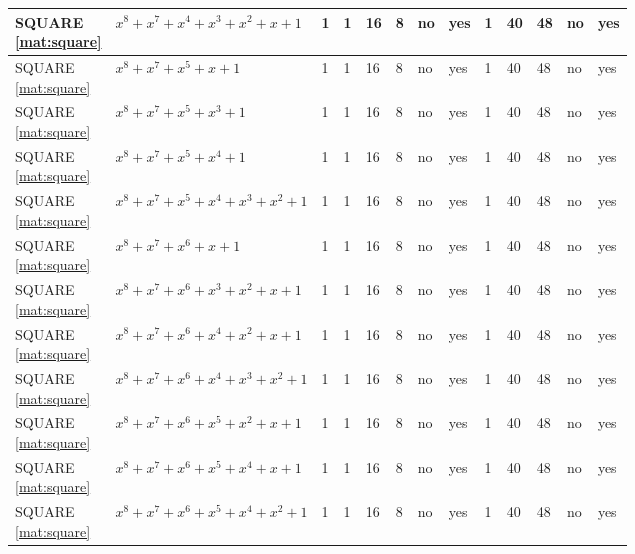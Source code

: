 \begin{tiny}
\begin{longtable}{|l|l|l|l|l|l|l|l|l|l|l|l|l|}
\shortstack{SQUARE \\ \eqref{mat:square}} & $x^8 + x^7 + x^4 + x^3 + x^2 + x + 1$ & 1 & 1 & 16 & 8 & no & yes & 1 & 40 & 48 & no & yes \\ \hline
\shortstack{SQUARE \\ \eqref{mat:square}} & $x^8 + x^7 + x^5 + x + 1$ & 1 & 1 & 16 & 8 & no & yes & 1 & 40 & 48 & no & yes \\ \hline
\shortstack{SQUARE \\ \eqref{mat:square}} & $x^8 + x^7 + x^5 + x^3 + 1$ & 1 & 1 & 16 & 8 & no & yes & 1 & 40 & 48 & no & yes \\ \hline
\shortstack{SQUARE \\ \eqref{mat:square}} & $x^8 + x^7 + x^5 + x^4 + 1$ & 1 & 1 & 16 & 8 & no & yes & 1 & 40 & 48 & no & yes \\ \hline
\shortstack{SQUARE \\ \eqref{mat:square}} & $x^8 + x^7 + x^5 + x^4 + x^3 + x^2 + 1$ & 1 & 1 & 16 & 8 & no & yes & 1 & 40 & 48 & no & yes \\ \hline
\shortstack{SQUARE \\ \eqref{mat:square}} & $x^8 + x^7 + x^6 + x + 1$ & 1 & 1 & 16 & 8 & no & yes & 1 & 40 & 48 & no & yes \\ \hline
\shortstack{SQUARE \\ \eqref{mat:square}} & $x^8 + x^7 + x^6 + x^3 + x^2 + x + 1$ & 1 & 1 & 16 & 8 & no & yes & 1 & 40 & 48 & no & yes \\ \hline
\shortstack{SQUARE \\ \eqref{mat:square}} & $x^8 + x^7 + x^6 + x^4 + x^2 + x + 1$ & 1 & 1 & 16 & 8 & no & yes & 1 & 40 & 48 & no & yes \\ \hline
\shortstack{SQUARE \\ \eqref{mat:square}} & $x^8 + x^7 + x^6 + x^4 + x^3 + x^2 + 1$ & 1 & 1 & 16 & 8 & no & yes & 1 & 40 & 48 & no & yes \\ \hline
\shortstack{SQUARE \\ \eqref{mat:square}} & $x^8 + x^7 + x^6 + x^5 + x^2 + x + 1$ & 1 & 1 & 16 & 8 & no & yes & 1 & 40 & 48 & no & yes \\ \hline
\shortstack{SQUARE \\ \eqref{mat:square}} & $x^8 + x^7 + x^6 + x^5 + x^4 + x + 1$ & 1 & 1 & 16 & 8 & no & yes & 1 & 40 & 48 & no & yes \\ \hline
\shortstack{SQUARE \\ \eqref{mat:square}} & $x^8 + x^7 + x^6 + x^5 + x^4 + x^2 + 1$ & 1 & 1 & 16 & 8 & no & yes & 1 & 40 & 48 & no & yes \\ \hline

\end{longtable}
\end{tiny}
